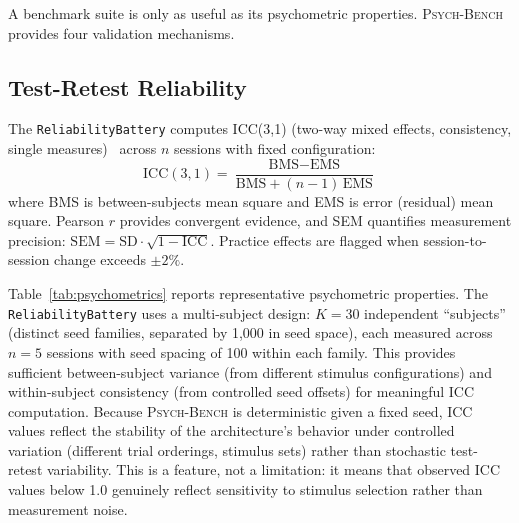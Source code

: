 \documentclass[11pt,letterpaper]{article}
\newcommand{\psychbench}{\textsc{Psych-Bench}}
\begin{document}
A benchmark suite is only as useful as its psychometric properties. \psychbench{} provides four validation mechanisms.

\subsection{Test-Retest Reliability}

The \texttt{ReliabilityBattery} computes ICC(3,1) (two-way mixed effects, consistency, single measures)~\citep{shrout1979intraclass} across $n$ sessions with fixed configuration:
\begin{equation}
\text{ICC}(3,1) = \frac{\text{BMS} - \text{EMS}}{\text{BMS} + (n-1)\,\text{EMS}}
\end{equation}
where BMS is between-subjects mean square and EMS is error (residual) mean square. Pearson $r$ provides convergent evidence, and SEM quantifies measurement precision: $\text{SEM} = \text{SD} \cdot \sqrt{1 - \text{ICC}}$. Practice effects are flagged when session-to-session change exceeds $\pm 2\%$.

Table~\ref{tab:psychometrics} reports representative psychometric properties. The \texttt{ReliabilityBattery} uses a multi-subject design: $K = 30$ independent ``subjects'' (distinct seed families, separated by 1,000 in seed space), each measured across $n = 5$ sessions with seed spacing of 100 within each family. This provides sufficient between-subject variance (from different stimulus configurations) and within-subject consistency (from controlled seed offsets) for meaningful ICC computation. Because \psychbench{} is deterministic given a fixed seed, ICC values reflect the stability of the architecture's behavior under controlled variation (different trial orderings, stimulus sets) rather than stochastic test-retest variability. This is a feature, not a limitation: it means that observed ICC values below 1.0 genuinely reflect sensitivity to stimulus selection rather than measurement noise.
\end{document}
